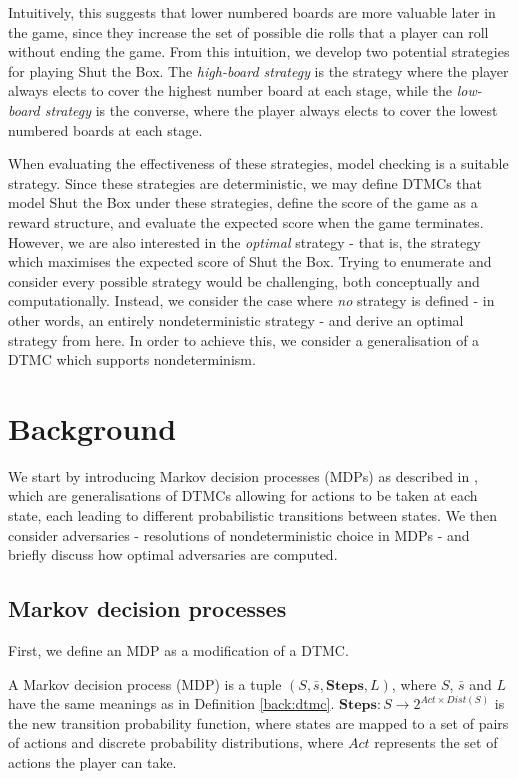 Intuitively, this suggests that lower numbered boards are more valuable later in the game, since they increase the set of possible die rolls that a player can roll without ending the game. From this intuition, we develop two potential strategies for playing Shut the Box. The \emph{high-board strategy} is the strategy where the player always elects to cover the highest number board at each stage, while the \emph{low-board strategy} is the converse, where the player always elects to cover the lowest numbered boards at each stage.

When evaluating the effectiveness of these strategies, model checking is a suitable strategy. Since these strategies are deterministic, we may define DTMCs that model Shut the Box under these strategies, define the score of the game as a reward structure, and evaluate the expected score when the game terminates. However, we are also interested in the \emph{optimal} strategy - that is, the strategy which maximises the expected score of Shut the Box. Trying to enumerate and consider every possible strategy would be challenging, both conceptually and computationally. Instead, we consider the case where \emph{no} strategy is defined - in other words, an entirely nondeterministic strategy - and derive an optimal strategy from here. In order to achieve this, we consider a generalisation of a DTMC which supports nondeterminism.

\section{Background}
\label{cs1:stb_background}

We start by introducing Markov decision processes (MDPs) as described in \cite{FKNP11}, which are generalisations of DTMCs allowing for actions to be taken at each state, each leading to different probabilistic transitions between states. We then consider adversaries - resolutions of nondeterministic choice in MDPs - and briefly discuss how optimal adversaries are computed.

\subsection{Markov decision processes}
\label{cs1:mdps}
First, we define an MDP as a modification of a DTMC.

\begin{definition}
\label{cs1:def_mdps}

A Markov decision process (MDP) is a tuple $(S, \bar{s}, \mathbf{Steps}, L)$, where $S$, $\bar{s}$ and $L$ have the same meanings as in Definition \ref{back:dtmc}. $\mathbf{Steps} : S \rightarrow 2^{Act \times Dist(S)}$ is the new transition probability function, where states are mapped to a set of pairs of actions and discrete probability distributions, where $Act$ represents the set of actions the player can take.

\end{definition}

